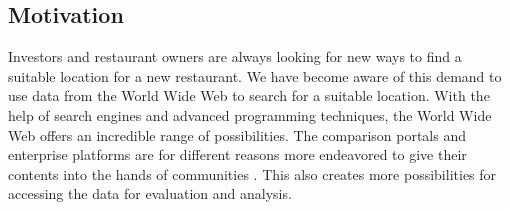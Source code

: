 \subsection{Motivation}
\label{subsec:motivation}
Investors and restaurant owners are always looking for new ways to find a suitable location for a new restaurant. We have become aware of this demand to use data from the World Wide Web to search for a suitable location. With the help of search engines and advanced programming techniques, the World Wide Web offers an incredible range of possibilities. The comparison portals and enterprise platforms are for different reasons more endeavored to give their contents into the hands of communities \cite{socialbusiness}. This also creates more possibilities for accessing the data for evaluation and analysis. 
